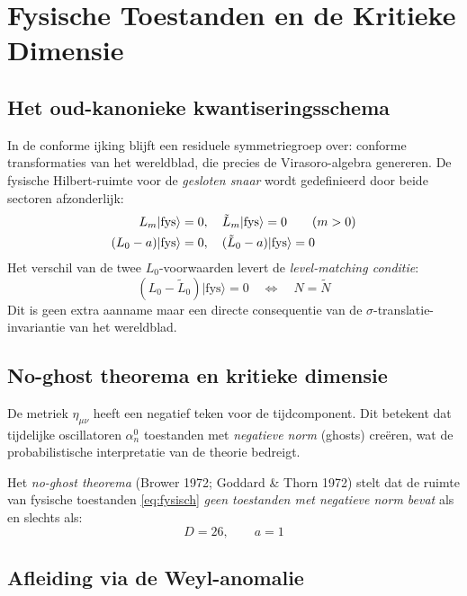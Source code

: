 \documentclass[12pt,a4paper]{article}
\begin{document}
\section{Fysische Toestanden en de Kritieke Dimensie}

\subsection{Het oud-kanonieke kwantiseringsschema}

In de conforme ijking blijft een residuele symmetriegroep over: conforme transformaties van het wereldblad, die precies de Virasoro-algebra genereren. De fysische Hilbert-ruimte voor de \emph{gesloten snaar} wordt gedefinieerd door beide sectoren afzonderlijk:
\begin{align}
  L_m|\mathrm{fys}\rangle &= 0, \quad \tilde L_m|\mathrm{fys}\rangle = 0 \qquad (m > 0) \notag\\
  (L_0 - a)|\mathrm{fys}\rangle &= 0, \quad (\tilde L_0 - a)|\mathrm{fys}\rangle = 0
  \label{eq:fysisch}
\end{align}
Het verschil van de twee $L_0$-voorwaarden levert de \emph{level-matching conditie}:
\begin{equation}
  (L_0 - \tilde L_0)|\mathrm{fys}\rangle = 0 \quad \Longleftrightarrow \quad N = \tilde N
\end{equation}
Dit is geen extra aanname maar een directe consequentie van de $\sigma$-translatie-invariantie van het wereldblad.

\subsection{No-ghost theorema en kritieke dimensie}

De metriek $\eta_{\mu\nu}$ heeft een negatief teken voor de tijdcomponent. Dit betekent dat tijdelijke oscillatoren $\alpha_n^0$ toestanden met \emph{negatieve norm} (ghosts) cre\"eren, wat de probabilistische interpretatie van de theorie bedreigt.

Het \emph{no-ghost theorema} (Brower 1972; Goddard \& Thorn 1972) stelt dat de ruimte van fysische toestanden \eqref{eq:fysisch} \emph{geen toestanden met negatieve norm bevat} als en slechts als:
\begin{equation}
  \boxed{D = 26, \qquad a = 1}
  \label{eq:kritiek}
\end{equation}

\subsection{Afleiding via de Weyl-anomalie}
\end{document}
